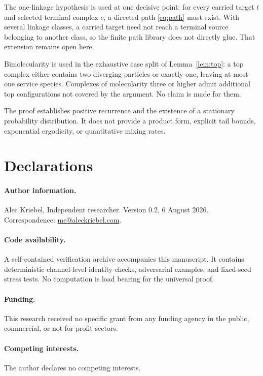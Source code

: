 The one-linkage hypothesis is used at one decisive point: for every carried
target \(t\) and selected terminal complex \(c\), a directed path
\eqref{eq:path} must exist.  With several linkage classes, a carried target
need not reach a terminal source belonging to another class, so the finite
path library does not directly glue.  That extension remains open here.

Bimolecularity is used in the exhaustive case split of
Lemma~\ref{lem:top}: a top complex either contains two diverging particles or
exactly one, leaving at most one service species.  Complexes of molecularity
three or higher admit additional top configurations not covered by the
argument.  No claim is made for them.

The proof establishes positive recurrence and the existence of a stationary
probability distribution.  It does not provide a product form, explicit tail
bounds, exponential ergodicity, or quantitative mixing rates.

\section*{Declarations}

\paragraph{Author information.}
Alec Kriebel, Independent researcher.  Version 0.2, 6 August 2026.\\
Correspondence: \mbox{\href{mailto:me@aleckriebel.com}{me@aleckriebel.com}}.

\paragraph{Code availability.}
A self-contained verification archive accompanies this manuscript.  It
contains deterministic channel-level identity checks, adversarial examples,
and fixed-seed stress tests.  No computation is load bearing for the
universal proof.

\paragraph{Funding.}
This research received no specific grant from any funding agency in the public,
commercial, or not-for-profit sectors.

\paragraph{Competing interests.}
The author declares no competing interests.

